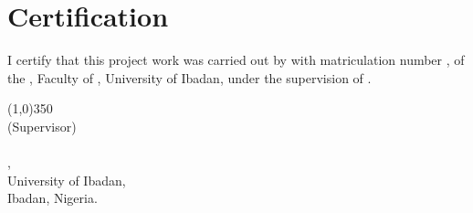 \chapter*{Certification}
I certify that this project work was carried out by \textsc{\Author} with matriculation number \textbf{\MatricNumber}, of the \Department, Faculty of \Faculty, University of Ibadan, under the supervision of \textbf{\Supervisor}.
\vspace*{3cm}
\begin{center}
    \line(1,0){350}\\
    (Supervisor)\\
    \vspace*{-0.25cm}
    \textbf{\Supervisor}
    \\
    \vspace*{-0.25cm}
    \Department,
    \\
    \vspace*{-0.25cm}
    University of Ibadan,
    \\
    \vspace*{-0.25cm}
    Ibadan, Nigeria.

\end{center}